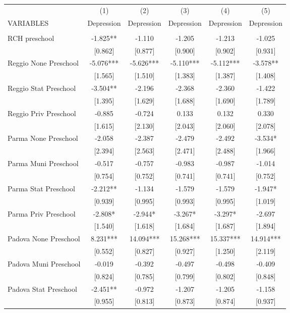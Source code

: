 \begin{tabular}{lccccc} \hline
 & (1) & (2) & (3) & (4) & (5) \\
VARIABLES & Depression & Depression & Depression & Depression & Depression \\ \hline
 &  &  &  &  &  \\
RCH preschool & -1.825** & -1.110 & -1.205 & -1.213 & -1.025 \\
 & [0.862] & [0.877] & [0.900] & [0.902] & [0.931] \\
Reggio None Preschool & -5.076*** & -5.626*** & -5.110*** & -5.112*** & -3.578** \\
 & [1.565] & [1.510] & [1.383] & [1.387] & [1.408] \\
Reggio Stat Preschool & -3.504** & -2.196 & -2.368 & -2.360 & -1.422 \\
 & [1.395] & [1.629] & [1.688] & [1.690] & [1.789] \\
Reggio Priv Preschool & -0.885 & -0.724 & 0.133 & 0.132 & 0.330 \\
 & [1.615] & [2.130] & [2.043] & [2.060] & [2.078] \\
Parma None Preschool & -2.058 & -2.387 & -2.479 & -2.492 & -3.534* \\
 & [2.394] & [2.563] & [2.471] & [2.488] & [1.966] \\
Parma Muni Preschool & -0.517 & -0.757 & -0.983 & -0.987 & -1.014 \\
 & [0.754] & [0.752] & [0.741] & [0.741] & [0.752] \\
Parma Stat Preschool & -2.212** & -1.134 & -1.579 & -1.579 & -1.947* \\
 & [0.939] & [0.995] & [0.993] & [0.995] & [1.019] \\
Parma Priv Preschool & -2.808* & -2.944* & -3.267* & -3.297* & -2.697 \\
 & [1.540] & [1.618] & [1.684] & [1.687] & [1.894] \\
Padova None Preschool & 8.231*** & 14.094*** & 15.268*** & 15.337*** & 14.914*** \\
 & [0.552] & [0.827] & [0.927] & [1.250] & [2.119] \\
Padova Muni Preschool & -0.019 & -0.392 & -0.497 & -0.498 & -0.409 \\
 & [0.824] & [0.785] & [0.799] & [0.802] & [0.848] \\
Padova Stat Preschool & -2.451** & -0.972 & -1.207 & -1.205 & -1.158 \\
 & [0.955] & [0.813] & [0.873] & [0.874] & [0.937] \\

\end{tabular}
